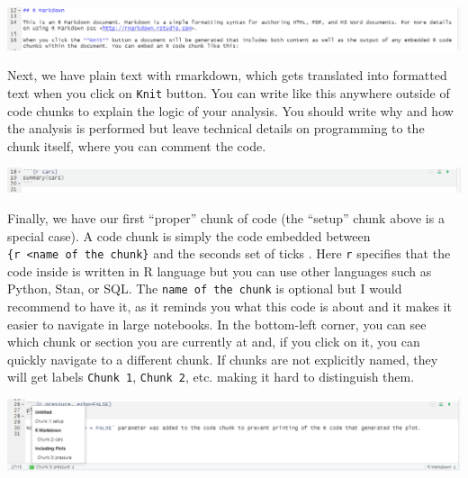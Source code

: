 \documentclass[
]{book}
\begin{document}
\begin{center}\includegraphics[width=1\linewidth]{images/notebook-text} \end{center}

Next, we have plain text with rmarkdown, which gets translated into formatted text when you click on \texttt{Knit} button. You can write like this anywhere outside of code chunks to explain the logic of your analysis. You should write why and how the analysis is performed but leave technical details on programming to the chunk itself, where you can comment the code.

\begin{center}\includegraphics[width=1\linewidth]{images/notebook-chunk} \end{center}

Finally, we have our first ``proper'' chunk of code (the ``setup'' chunk above is a special case). A code chunk is simply the code embedded between
\texttt{\textasciigrave{}\textasciigrave{}\textasciigrave{}\{r\ \textless{}name\ of\ the\ chunk\}} and the seconds set of ticks \texttt{\textasciigrave{}\textasciigrave{}\textasciigrave{}}. Here \texttt{r} specifies that the code inside is written in R language but you can use other languages such as Python, Stan, or SQL. The \texttt{name\ of\ the\ chunk} is optional but I would recommend to have it, as it reminds you what this code is about and it makes it easier to navigate in large notebooks. In the bottom-left corner, you can see which chunk or section you are currently at and, if you click on it, you can quickly navigate to a different chunk. If chunks are not explicitly named, they will get labels \texttt{Chunk\ 1}, \texttt{Chunk\ 2}, etc. making it hard to distinguish them.

\begin{center}\includegraphics[width=1\linewidth]{images/notebook-navigation} \end{center}
\end{document}
